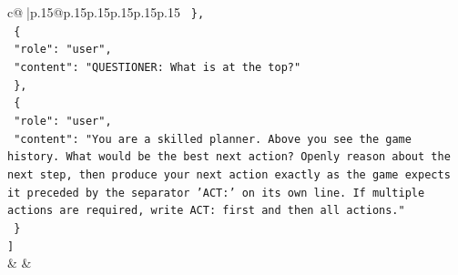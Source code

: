 \documentclass{article}
\begin{document}
{\begin{supertabular}{c@{$\;$}|p{.15\linewidth}@{}p{.15\linewidth}p{.15\linewidth}p{.15\linewidth}p{.15\linewidth}p{.15\linewidth}}
{{{\texttt{  \},} \\
\texttt{  \{} \\
\texttt{    "role": "user",} \\
\texttt{    "content": "QUESTIONER: What is at the top?"} \\
\texttt{  \},} \\
\texttt{  \{} \\
\texttt{    "role": "user",} \\
\texttt{    "content": "You are a skilled planner. Above you see the game history. What would be the best next action? Openly reason about the next step, then produce your next action exactly as the game expects it preceded by the separator 'ACT:' on its own line. If multiple actions are required, write ACT: first and then all actions."} \\
\texttt{  \}} \\
\texttt{{]}} \\
            }
        }
    }
    & & \\ \\


\end{supertabular}}
\end{document}
